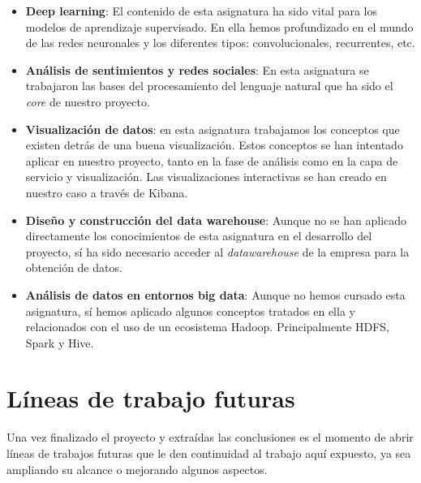 \begin{itemize}
\item  \textbf{Deep learning}: El contenido de esta asignatura ha sido vital para los modelos de aprendizaje supervisado. En ella hemos profundizado en el mundo de las redes neuronales y los diferentes tipos: convolucionales, recurrentes, etc.

\item  \textbf{Análisis de sentimientos y redes sociales}: En esta asignatura se trabajaron las bases del procesamiento del lenguaje natural que ha sido el \textit{core} de nuestro proyecto.

\item  \textbf{Visualización de datos}: en esta asignatura trabajamos los conceptos que existen detrás de una buena visualización. Estos conceptos se han intentado aplicar en nuestro proyecto, tanto en la fase de análisis como en la capa de servicio y visualización. Las visualizaciones interactivas se han creado en nuestro caso a través de Kibana.

\item  \textbf{Diseño y construcción del data warehouse}: Aunque no se han aplicado directamente los conocimientos de esta asignatura en el desarrollo del proyecto, sí ha sido necesario acceder al \textit{datawarehouse} de la empresa para la obtención de datos.


\item \textbf{Análisis de datos en entornos big data}: Aunque no hemos cursado esta asignatura, sí hemos aplicado algunos conceptos tratados en ella y relacionados con el uso de un ecosistema Hadoop. Principalmente HDFS, Spark y Hive.


\end{itemize}





\section{Líneas de trabajo futuras}

Una vez finalizado el proyecto y extraídas las conclusiones es el momento de abrir líneas de trabajos futuras que le den continuidad al trabajo aquí expuesto, ya sea ampliando su alcance o mejorando algunos aspectos.

